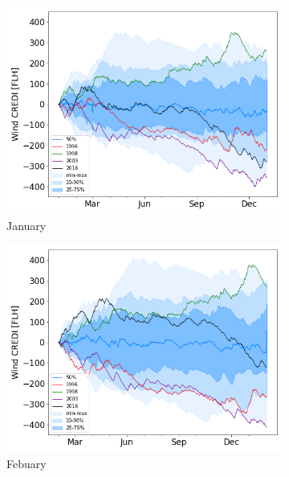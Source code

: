 \documentclass[a4paper,11pt]{extarticle}
\begin{document}
\begin{figure}[b]
\centering
\begin{subfigure}[t]{0.32\linewidth}
    \includegraphics[width=\linewidth]{Fig_CUMSUM_YearStart_January}
    \caption{January }
\end{subfigure}
\begin{subfigure}[t]{0.32\linewidth}
    \includegraphics[width=\linewidth]{Fig_CUMSUM_YearStart_February}
    \caption{Febuary }
\end{subfigure}
\begin{subfigure}[t]{0.32\linewidth}

\end{subfigure}
\end{figure}
\end{document}

